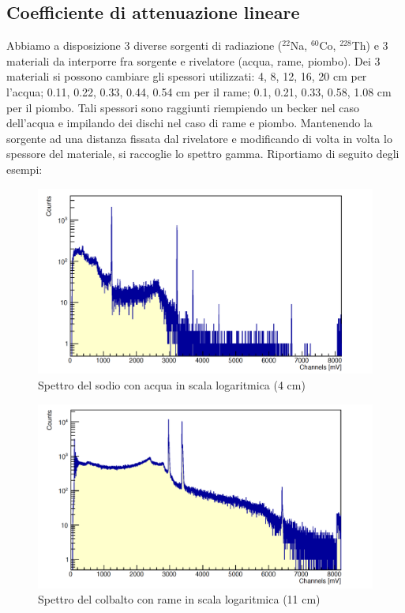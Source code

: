 \documentclass[a4paper,10pt]{article}
\begin{document}
\subsection{Coefficiente di attenuazione lineare}
\noindent Abbiamo a disposizione 3 diverse sorgenti di radiazione (${}^{22}$Na, ${}^{60}$Co, ${}^{228}$Th) e 3 materiali da interporre fra sorgente e rivelatore (acqua, rame, piombo). Dei 3 materiali si possono cambiare gli spessori utilizzati: 4, 8, 12, 16, 20 cm per l'acqua; 0.11, 0.22, 0.33, 0.44, 0.54 cm per il rame; 0.1, 0.21, 0.33, 0.58, 1.08 cm per il piombo. Tali spessori sono raggiunti riempiendo un becker nel caso dell'acqua e impilando dei dischi nel caso di rame e piombo. Mantenendo la sorgente ad una distanza fissata dal rivelatore e modificando di volta in volta lo spessore del materiale, si raccoglie lo spettro gamma. Riportiamo di seguito degli esempi:

\begin{figure}[!h]
    \centering
    \includegraphics[scale=0.4]{img/sodioacqua}
    \caption{Spettro del sodio con acqua in scala logaritmica (4 cm)}
\end{figure}

\begin{figure}[!h]
    \centering
    \includegraphics[scale=0.4]{img/cobaltorame}
    \caption{Spettro del colbalto con rame in scala logaritmica (11 cm)}
\end{figure}
\end{document}
